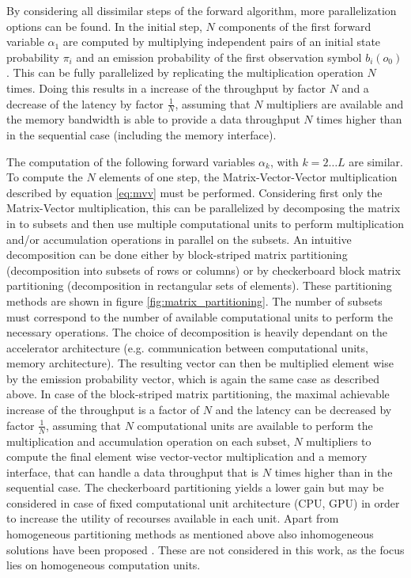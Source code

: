 \documentclass[mscthesis]{usiinfthesis}
\begin{document}
By considering all dissimilar steps of the forward algorithm, more
parallelization options can be found. In the initial step, $N$ components of
the first forward variable $\alpha_1$ are computed by multiplying independent
pairs of an initial state probability $\pi_i$ and an emission probability of
the first observation symbol $b_i(o_0)$. This can be fully parallelized by
replicating the multiplication operation $N$ times. Doing this results in
a increase of the throughput by factor $N$ and a decrease of the latency by
factor $\frac{1}{N}$, assuming that $N$ multipliers are available and the
memory bandwidth is able to provide a data throughput $N$ times higher than in
the sequential case (including the memory interface).

The computation of the following forward variables $\alpha_k$, with $k
= 2 \dots L$ are similar. To compute the $N$ elements of one step, the
Matrix-Vector-Vector multiplication described by equation \ref{eq:mvv} must be
performed. Considering first only the Matrix-Vector multiplication, this can be
parallelized by decomposing the matrix in to subsets and then use multiple
computational units to perform multiplication and/or accumulation operations in
parallel on the subsets. An intuitive decomposition can be done either by
block-striped matrix partitioning (decomposition into subsets of rows or
columns) or by checkerboard block matrix partitioning (decomposition in
rectangular sets of elements). These partitioning methods are shown in figure
\ref{fig:matrix_partitioning}. The number of subsets must correspond to the
number of available computational units to perform the necessary operations.
The choice of decomposition is heavily dependant on the accelerator
architecture (e.g.  communication between computational units, memory
architecture). The resulting vector can then be multiplied element wise by the
emission probability vector, which is again the same case as described above.
In case of the block-striped matrix partitioning, the maximal achievable
increase of the throughput is a factor of $N$ and the latency can be decreased
by factor $\frac{1}{N}$, assuming that $N$ computational units are available to
perform the multiplication and accumulation operation on each subset, $N$
multipliers to compute the final element wise vector-vector multiplication and
a memory interface, that can handle a data throughput that is $N$ times higher
than in the sequential case. The checkerboard partitioning yields a lower gain
but may be considered in case of fixed computational unit architecture (CPU,
GPU) in order to increase the utility of recourses available in each unit.
Apart from homogeneous partitioning methods as mentioned above also
inhomogeneous solutions have been proposed \cite{IPDPSW12_DeFlumere, clarke11}.
These are not considered in this work, as the focus lies on homogeneous
computation units.
\end{document}
